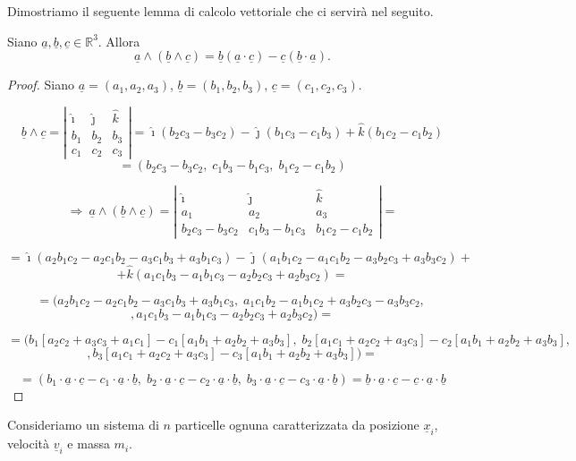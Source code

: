 Dimostriamo il seguente lemma di calcolo vettoriale che ci servirà nel seguito.
\begin{lemma}{}
Siano \( \underline{a}, \underline{b}, \underline{c} \in \mathbb{R}^3 \). Allora
\[
\underline{a} \wedge (\underline{b} \wedge \underline{c}) = \underline{b} (\underline{a} \cdot \underline{c}) - \underline{c} (\underline{b} \cdot \underline{a}).
\]
\end{lemma}
\inizioapprof
\begin{proof}
Siano \(\underline{a}=(a_1,a_2,a_3)\), \(\underline{b}=(b_1,b_2,b_3)\), \(\underline{c}=(c_1,c_2,c_3)\).

\[
\underline{b}\wedge \underline{c}=
\left|
\begin{array}{ccc}
\hat{\imath} & \hat{\jmath} & \hat{k}\\
b_1 & b_2 & b_3\\
c_1 & c_2 & c_3
\end{array}
\right|
=
\hat{\imath}(b_2c_3-b_3c_2)-\hat{\jmath}(b_1c_3-c_1b_3)+\hat{k}(b_1c_2-c_1b_2)
\]
\[
=
(b_2c_3-b_3c_2,\;c_1b_3-b_1c_3,\;b_1c_2-c_1b_2)
\]

\[
\Rightarrow\ \underline{a}\wedge(\underline{b}\wedge \underline{c})=
\left|
\begin{array}{ccc}
\hat{\imath} & \hat{\jmath} & \hat{k}\\
a_1 & a_2 & a_3\\
b_2c_3-b_3c_2 & c_1b_3-b_1c_3 & b_1c_2-c_1b_2
\end{array}
\right|
=
\]

\[
=
\hat{\imath}(a_2b_1c_2-a_2c_1b_2-a_3c_1b_3+a_3b_1c_3)
-\hat{\jmath}(a_1b_1c_2-a_1c_1b_2-a_3b_2c_3+a_3b_3c_2)+
\]
\[
+\hat{k}(a_1c_1b_3-a_1b_1c_3-a_2b_2c_3+a_2b_3c_2)=
\]

\[
=
(a_2b_1c_2-a_2c_1b_2-a_3c_1b_3+a_3b_1c_3,\;
a_1c_1b_2-a_1b_1c_2+a_3b_2c_3-a_3b_3c_2,\;
\]
\[
,a_1c_1b_3-a_1b_1c_3-a_2b_2c_3+a_2b_3c_2)=
\]

\[
=
\bigl(
b_1[a_2c_2+a_3c_3+a_1c_1]-c_1[a_1b_1+a_2b_2+a_3b_3],\;
b_2[a_1c_1+a_2c_2+a_3c_3]-c_2[a_1b_1+a_2b_2+a_3b_3],\;
\]
\[
,b_3[a_1c_1+a_2c_2+a_3c_3]-c_3[a_1b_1+a_2b_2+a_3b_3]
\bigr)=
\]

\[
=
(b_1\cdot \underline{a}\cdot \underline{c}-c_1\cdot \underline{a}\cdot \underline{b},\;
b_2\cdot \underline{a}\cdot \underline{c}-c_2\cdot \underline{a}\cdot \underline{b},\;
b_3\cdot \underline{a}\cdot \underline{c}-c_3\cdot \underline{a}\cdot \underline{b})
=
\underline{b}\cdot \underline{a}\cdot \underline{c}-\underline{c}\cdot \underline{a}\cdot \underline{b}
\]
\end{proof}
\fineapprof
Consideriamo un sistema di \(n\) particelle ognuna caratterizzata da posizione \(\underline{x}_i\), velocità \(\underline{v}_i\) e massa \(m_i\).


